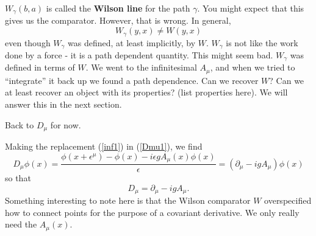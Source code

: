 \documentclass[main.tex]{subfiles}
\begin{document}
$W_\gamma (b,a)$ is called the \textbf{Wilson line} for the path $\gamma$. You might expect that this gives us the comparator. However, that is wrong. In general,
\[
W_\gamma (y,x) \neq W(y,x)
\]
even though $W_\gamma$ was defined, at least implicitly, by $W$. $W_\gamma$ is not like the work done by a force - it is a path dependent quantity. This might seem bad. $W_\gamma$ was defined in terms of $W$. We went to the infinitesimal $A_\mu$, and when we tried to ``integrate'' it back up we found a path dependence. Can we recover $W$? Can we at least recover an object with its properties? (list properties here). We will answer this in the next section.

Back to $D_\mu$ for now.

Making the replacement (\ref{inf1}) in (\ref{Dmu1}), we find
\[
D_\mu \phi (x) = \frac{\phi(x + \epsilon^\mu) - \phi(x) - i \epsilon g A_\mu (x) \phi(x)}{\epsilon} = \left(
\partial_\mu - ig A_\mu 
\right) \phi(x)
\]
so that
\begin{equation} \label{Dmu2}
\boxed{D_\mu = \partial_\mu - i g A_\mu}.
\end{equation}
Something interesting to note here is that the Wilson comparator $W$ overspecified how to connect points for the purpose of a covariant derivative. We only really need the $A_\mu (x)$.
\end{document}
